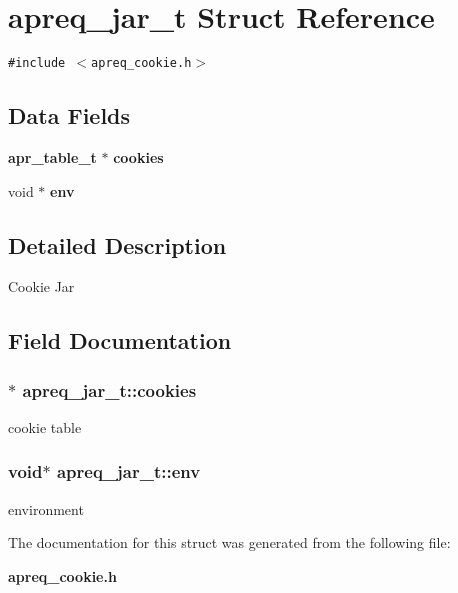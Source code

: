 \section{apreq\_\-jar\_\-t Struct Reference}
\label{structapreq__jar__t}
{\tt \#include $<$apreq\_\-cookie.h$>$}

\subsection*{Data Fields}
\begin{CompactItemize}
\item 
{\bf apr\_\-table\_\-t} $\ast$ {\bf cookies}
\item 
void $\ast$ {\bf env}
\end{CompactItemize}


\subsection{Detailed Description}
Cookie Jar 



\subsection{Field Documentation}
\subsubsection{$\ast$ apreq\_\-jar\_\-t::cookies}\label{structapreq__jar__t_m0}


cookie table 
\subsubsection{\setlength{\rightskip}{0pt plus 5cm}void$\ast$ apreq\_\-jar\_\-t::env}\label{structapreq__jar__t_m1}


environment 

The documentation for this struct was generated from the following file:\begin{CompactItemize}
\item 
{\bf apreq\_\-cookie.h}\end{CompactItemize}
